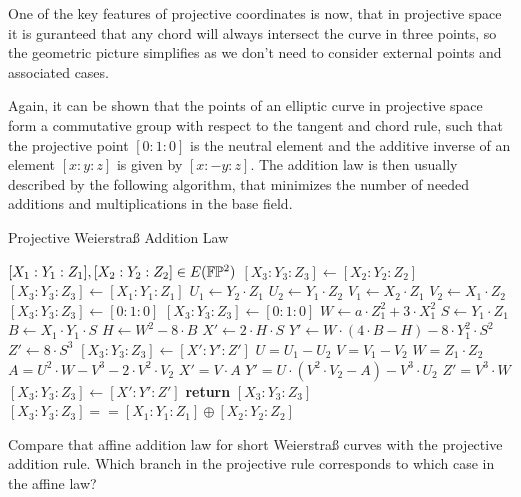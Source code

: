 One of the key features of projective coordinates is now, that in projective space it is guranteed that any chord will always intersect the curve in three points, so the geometric picture simplifies as we don't need to consider external points and associated cases.


Again, it can be shown that the points of an elliptic curve in projective space form a commutative group with respect to the tangent and chord rule, such that the projective point $[0:1:0]$ is the neutral element and the additive inverse of an element $[x:y:z]$ is given by $[x:-y:z]$. The addition law is then usually described by the following algorithm, that minimizes the number of needed additions and multiplications in the base field. 

\begin{algorithm}\caption{Projective Weierstraß Addition Law}
\label{alg_projective_group_law}
\begin{algorithmic}[0]
\Require $[X_1:Y_1:Z_1],[X_2:Y_2:Z_2] \in E(\mathbb{F}\mathbb{P}^2)$
\If{$[X_1:Y_1:Z_1] == [0:1:0]$}
  \State $[X_3:Y_3:Z_3] \gets [X_2:Y_2:Z_2]$
\ElsIf{$[X_2:Y_2:Z_2] == [0:1:0]$}
  \State $[X_3:Y_3:Z_3] \gets [X_1:Y_1:Z_1]$
\Else
  \State $U_1 \gets Y_2\cdot Z_1$
  \State $U_2 \gets Y_1\cdot Z_2$
  \State $V_1 \gets X_2\cdot Z_1$
  \State $V_2 \gets X_1\cdot Z_2$
      $[X_3:Y_3:Z_3] \gets [0:1:0]$
    \Else
        $[X_3:Y_3:Z_3] \gets [0:1:0]$
      \Else
        \State $W \gets a\cdot Z_1^2 + 3\cdot X_1^2$
        \State $S \gets Y_1\cdot Z_1$
        \State $B \gets X_1\cdot Y_1\cdot S$
        \State $H \gets W^2 - 8\cdot B$
        \State $X' \gets 2\cdot H\cdot S$
        \State $Y' \gets W\cdot (4\cdot B - H) - 8\cdot Y_1^2\cdot S^2$
        \State $Z' \gets 8\cdot S^3$
        \State $[X_3:Y_3:Z_3] \gets [X':Y':Z']$
      \EndIf
    \EndIf
  \Else
    \State $U = U_1 - U_2$
    \State $V = V_1 - V_2$
    \State $W = Z_1\cdot Z_2$
    \State $A = U^2\cdot W - V^3 - 2\cdot V^2\cdot V_2$
    \State $X' = V\cdot A$
    \State $Y' = U\cdot(V^2\cdot V_2 - A) - V^3\cdot U_2$
    \State $Z' = V^3\cdot W$
    \State $[X_3:Y_3:Z_3]\gets [X':Y':Z']$
  \EndIf
\EndIf
\State \textbf{return} $[X_3:Y_3:Z_3]$
\EndProcedure
\Ensure $ [X_3:Y_3:Z_3] == [X_1:Y_1:Z_1] \oplus [X_2:Y_2:Z_2]$
\end{algorithmic}
\end{algorithm}
\begin{exercise}
Compare that affine addition law for short Weierstraß curves with the projective addition rule. Which branch in the projective rule corresponds to which case in the affine law? 
\end{exercise}

